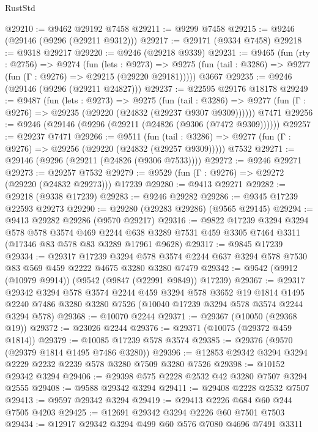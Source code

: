\begin{lexlean}{RustStd}
\begin{coremodule}
@29210 := @9462 @29192 @7458
@29211 := @9299 @7458
@29215 := @9246 (@29146 (@9296 (@29211 @9312)))
@29217 := @29171 (@9334 @7458)
@29218 := @9318 @29217
@29220 := @9246 (@29218 @9339)
@29231 := @9465
    (fun (rty : @2756) =>
    @9274
      (fun (lets : @9273) =>
      @9275 (fun (tail : @3286) => @9277 (fun (Γ : @9276) => @29215 (@29220 @29181)))))
    @3667
@29235 := @9246 (@29146 (@9296 (@29211 @24827)))
@29237 := @22595 @29176 @18178
@29249 := @9487
    (fun (lets : @9273) =>
    @9275
      (fun (tail : @3286) =>
      @9277 (fun (Γ : @9276) => @29235 (@29220 (@24832 (@29237 @9307 @9309))))))
    @7471
@29256 := @9246 (@29146 (@9296 (@29211 (@24826 (@9306 (@7472 @9309))))))
@29257 := @29237 @7471
@29266 := @9511
    (fun (tail : @3286) => @9277 (fun (Γ : @9276) => @29256 (@29220 (@24832 (@29257 @9309)))))
    @7532
@29271 := @29146 (@9296 (@29211 (@24826 (@9306 @7533))))
@29272 := @9246 @29271
@29273 := @29257 @7532
@29279 := @9529 (fun (Γ : @9276) => @29272 (@29220 (@24832 @29273))) @17239
@29280 := @9413 @29271
@29282 := @29218 (@9338 @17239)
@29283 := @9246 @29282
@29286 := @9345 @17239 @22593 @29273
@29290 := @29280 (@29283 @29286) (@9565 @29145)
@29294 := @9413 @29282 @29286 (@9570 @29217)
@29316 := @9822
    @17239
    @3294
    @3294
    @578
    @578
    @3574
    @469
    @2244
    @638
    @3289
    @7531
    @459
    @3305
    @7464
    @3311
    (@17346 @83 @578 @83 @3289 @17961 @9628)
@29317 := @9845 @17239
@29334 := @29317
    @17239
    @3294
    @578
    @3574
    @2244
    @637
    @3294
    @578
    @7530
    @83
    @569
    @459
    @2222
    @4675
    @3280
    @3280
    @7479
@29342 := @9542 (@9912 (@10979 @9914)) (@9542 (@9847 (@22991 @9849)) @17239)
@29367 := @29317
    @29342
    @3294
    @578
    @3574
    @2244
    @459
    @3294
    @578
    @3652
    @19
    @1814
    @1495
    @2240
    @7486
    @3280
    @3280
    @7526
    (@10040 @17239 @3294 @578 @3574 @2244 @3294 @578)
@29368 := @10070 @2244
@29371 := @29367 (@10050 (@29368 @19))
@29372 := @23026 @2244
@29376 := @29371 (@10075 (@29372 @459 @1814))
@29379 := @10085 @17239 @578 @3574
@29385 := @29376 (@9570 (@29379 @1814 @1495 @7486 @3280))
@29396 := @12853 @29342 @3294 @3294 @2229 @2232 @2239 @578 @3280 @7509 @3280 @7526
@29398 := @10152 @29342 @3294
@29406 := @29398 @575 @2228 @2532 @42 @3280 @7507 @3294 @2555
@29408 := @9588 @29342 @3294
@29411 := @29408 @2228 @2532 @7507
@29413 := @9597 @29342 @3294
@29419 := @29413 @2226 @684 @60 @244 @7505 @4203
@29425 := @12691 @29342 @3294 @2226 @60 @7501 @7503
@29434 := @12917 @29342 @3294 @499 @60 @576 @7080 @4696 @7491 @3311

\end{coremodule}
\end{lexlean}
